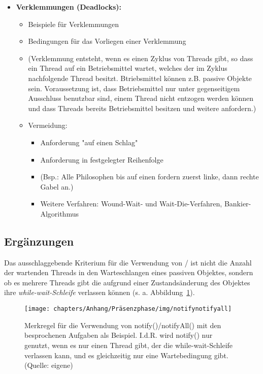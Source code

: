 \begin{itemize}
        \item \textbf{Verklemmungen (Deadlocks):}
        \begin{itemize}
            \item Beispiele für Verklemmungen
            \item Bedingungen für das Vorliegen einer Verklemmung
            \item[] (Verklemmung entsteht, wenn es einen Zyklus von Threads gibt, so dass ein Thread auf ein Betriebsmittel wartet, welches der im Zyklus nachfolgende Thread besitzt. Btriebsmittel können z.B. passive Objekte sein. Voraussetzung ist, dass Betriebsmittel nur unter gegenseitigem Ausschluss benutzbar sind, einem Thread nicht entzogen werden können und dass Threads bereits Betriebsmittel besitzen und weitere anfordern.)
            \item Vermeidung:
            \begin{itemize}
                \item Anforderung "auf einen Schlag"
                \item Anforderung in festgelegter Reihenfolge
                \item[] (Bsp.: Alle Philosophen bis auf einen fordern zuerst linke, dann rechte Gabel an.)
                \item Weitere Verfahren: Wound-Wait- und Wait-Die-Verfahren, Bankier-Algorithmus
            \end{itemize}
        \end{itemize}

    \end{itemize}

\subsection{Ergänzungen}
\begin{tcolorbox}
    Das ausschlaggebende Kriterium für die Verwendung von  /  ist nicht die Anzahl der wartenden Threads in den Warteschlangen eines passiven Objektes, sondern ob es mehrere Threads gibt die aufgrund einer Zustandsänderung des Objektes ihre \textit{while-wait-Schleife} verlassen können (s. a. Abbildung~\ref{fig:notifynotifyall}).
\end{tcolorbox}

\begin{figure}
    \centering
    \texttt{[image: chapters/Anhang/Präsenzphase/img/notifynotifyall]}
    \caption{Merkregel für die Verwendung von notify()/notifyAll() mit den besprochenen Aufgaben als Beispiel. I.d.R. wird notify() nur genutzt, wenn es nur einen Thread gibt, der die while-wait-Schleife verlassen kann, und es gleichzeitig nur eine Wartebedingung gibt. (Quelle: eigene)}
    \label{fig:notifynotifyall}
\end{figure}



